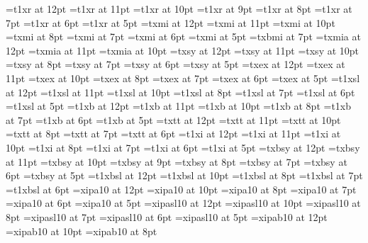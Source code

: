 \font\twelverm=t1xr at 12pt
\font\elevenrm=t1xr at 11pt
\font\tenrm=t1xr at 10pt
\font\ninerm=t1xr at 9pt
\font\eightrm=t1xr at 8pt
\font\sevenrm=t1xr at 7pt
\font\sixrm=t1xr at 6pt
\font\fiverm=t1xr at 5pt
\font\twelvei=txmi at 12pt
\font\eleveni=txmi at 11pt
\font\teni=txmi at 10pt
\font\eighti=txmi at 8pt
\font\seveni=txmi at 7pt
\font\sixi=txmi at 6pt
\font\fivei=txmi at 5pt
\font\sevenbi=txbmi at 7pt
\font\twelveia=txmia at 12pt
\font\elevenia=txmia at 11pt
\font\tenia=txmia at 10pt
\font\twelvesy=txsy at 12pt
\font\elevensy=txsy at 11pt
\font\tensy=txsy at 10pt
\font\eightsy=txsy at 8pt
\font\sevensy=txsy at 7pt
\font\sixsy=txsy at 6pt
\font\fivesy=txsy at 5pt
\font\twelveex=txex at 12pt
\font\elevenex=txex at 11pt
\font\tenex=txex at 10pt
\font\eightex=txex at 8pt
\font\sevenex=txex at 7pt
\font\sixex=txex at 6pt
\font\fiveex=txex at 5pt
\font\twelvesl=t1xsl at 12pt
\font\elevensl=t1xsl at 11pt
\font\tensl=t1xsl at 10pt
\font\eightsl=t1xsl at 8pt
\font\sevensl=t1xsl at 7pt
\font\sixsl=t1xsl at 6pt
\font\fivesl=t1xsl at 5pt
\font\twelvebf=t1xb at 12pt
\font\elevenbf=t1xb at 11pt
\font\tenbf=t1xb at 10pt
\font\eightbf=t1xb at 8pt
\font\sevenbf=t1xb at 7pt
\font\sixbf=t1xb at 6pt
\font\fivebf=t1xb at 5pt
\font\twelvett=txtt at 12pt
\font\eleventt=txtt at 11pt
\font\tentt=txtt at 10pt
\font\eighttt=txtt at 8pt
\font\seventt=txtt at 7pt
\font\sixtt=txtt at 6pt
\font\twelveit=t1xi at 12pt
\font\elevenit=t1xi at 11pt
\font\tenit=t1xi at 10pt
\font\eightit=t1xi at 8pt
\font\sevenit=t1xi at 7pt
\font\sixit=t1xi at 6pt
\font\fiveit=t1xi at 5pt
\font\twelvebsy=txbsy at 12pt
\font\elevensy=txbsy at 11pt
\font\tenbsy=txbsy at 10pt
\font\ninebsy=txbsy at 9pt
\font\eightbsy=txbsy at 8pt
\font\sevenbsy=txbsy at 7pt
\font\sixbsy=txbsy at 6pt
\font\fivebsy=txbsy at 5pt
\font\twelvebsl=t1xbsl at 12pt
\font\tenbsl=t1xbsl at 10pt
\font\eightbsl=t1xbsl at 8pt
\font\sevenbsl=t1xbsl at 7pt
\font\sixbsl=t1xbsl at 6pt
\font\twelveipr=xipa10 at 12pt
\font\tenipr=xipa10 at 10pt
\font\eightipr=xipa10 at 8pt
\font\sevenipr=xipa10 at 7pt
\font\sixipr=xipa10 at 6pt
\font\fiveipr=xipa10 at 5pt
\font\twelveips=xipasl10 at 12pt
\font\tenips=xipasl10 at 10pt
\font\eightips=xipasl10 at 8pt
\font\sevenips=xipasl10 at 7pt
\font\sixips=xipasl10 at 6pt
\font\fiveips=xipasl10 at 5pt
\font\twelveipb=xipab10 at 12pt
\font\tenipb=xipab10 at 10pt
\font\eightipb=xipab10 at 8pt
